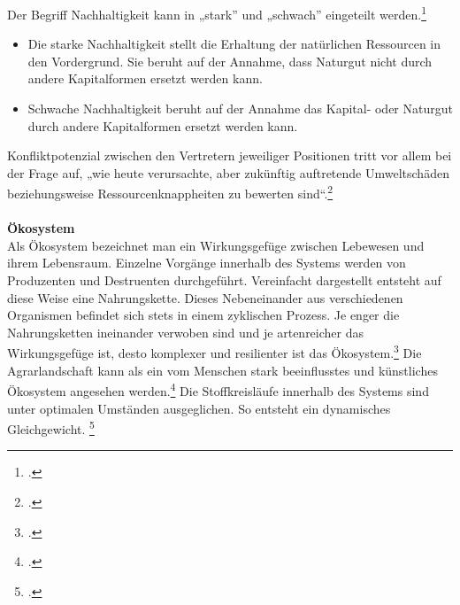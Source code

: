 \documentclass{scrartcl}
\begin{document}
\hfill \break
Der Begriff Nachhaltigkeit kann in „stark” und „schwach” eingeteilt werden.\footcite{Nachhaltigkeit}
\begin{itemize}
\item Die starke Nachhaltigkeit stellt die Erhaltung der natürlichen Ressourcen in den Vordergrund. Sie beruht auf der Annahme, dass Naturgut nicht durch andere Kapitalformen ersetzt werden kann.
\item Schwache Nachhaltigkeit beruht auf der Annahme das Kapital- oder Naturgut durch andere Kapitalformen ersetzt werden kann.
\end{itemize}
Konfliktpotenzial zwischen den Vertretern jeweiliger Positionen tritt vor allem bei der Frage auf, „wie heute verursachte, aber zukünftig auftretende Umweltschäden beziehungsweise Ressourcenknappheiten zu bewerten sind“.\footcite{NachhaltigeBrockhaus.de}\\
\\
\textbf{Ökosystem}\\
Als Ökosystem bezeichnet man ein Wirkungsgefüge zwischen Lebewesen und ihrem Lebensraum. Einzelne Vorgänge innerhalb des Systems werden von Produzenten und Destruenten durchgeführt. Vereinfacht dargestellt entsteht auf diese Weise eine Nahrungskette. Dieses Nebeneinander aus verschiedenen Organismen befindet sich stets in einem zyklischen Prozess. Je enger die Nahrungsketten ineinander verwoben sind und je artenreicher das Wirkungsgefüge ist, desto komplexer und resilienter ist das Ökosystem.\footcite{NachhaltigeBrockhaus.de} Die Agrarlandschaft kann als ein vom Menschen stark beeinflusstes und künstliches Ökosystem angesehen werden.\footcite[Vgl.]{BrockhausOkosystem} Die Stoffkreisläufe innerhalb des Systems sind unter optimalen Umständen ausgeglichen. So entsteht ein dynamisches Gleichgewicht. \footcite{BrockhausOkosystem}
\end{document}
